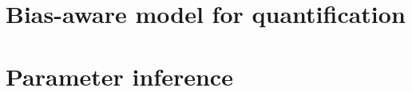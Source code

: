
\lipsum[5]

\section{Bias-aware model for quantification}

\lipsum[5]

\section{Parameter inference}

\lipsum[5]


